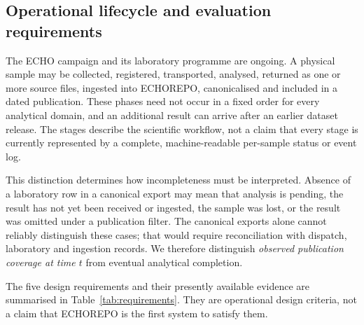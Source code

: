 \documentclass[11pt,a4paper]{article}
\begin{document}
\subsection{Operational lifecycle and evaluation requirements}
The ECHO campaign and its laboratory programme are ongoing. A physical sample may be collected, registered, transported, analysed, returned as one or more source files, ingested into ECHOREPO, canonicalised and included in a dated publication. These phases need not occur in a fixed order for every analytical domain, and an additional result can arrive after an earlier dataset release. The stages describe the scientific workflow, not a claim that every stage is currently represented by a complete, machine-readable per-sample status or event log.

This distinction determines how incompleteness must be interpreted. Absence of a laboratory row in a canonical export may mean that analysis is pending, the result has not yet been received or ingested, the sample was lost, or the result was omitted under a publication filter. The canonical exports alone cannot reliably distinguish these cases; that would require reconciliation with dispatch, laboratory and ingestion records. We therefore distinguish \emph{observed publication coverage at time $t$} from eventual analytical completion.

The five design requirements and their presently available evidence are summarised in Table~\ref{tab:requirements}. They are operational design criteria, not a claim that ECHOREPO is the first system to satisfy them.
\end{document}

